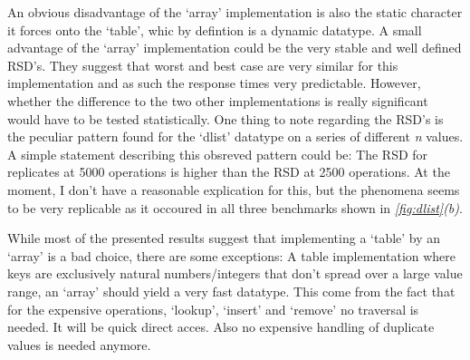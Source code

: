 \documentclass[a4paper,11pt,twoside]{article}
\begin{document}
An obvious disadvantage of the `array' implementation is also the
static character it forces onto the `table', whic by defintion is a 
dynamic datatype. A small advantage of the `array' implementation could be the
very stable and well defined RSD's. They suggest that worst and best
case are very similar for this implementation and as such the response
times very predictable. However, whether the difference to the two
other implementations is really significant would have to be tested
statistically. One thing to note regarding the RSD's is the peculiar
pattern found for the `dlist' datatype on a series of different
\textit{n} values. A simple statement describing this obsreved pattern
could be: The RSD for replicates at 5000 operations is higher than the
RSD at 2500 operations. At the moment, I don't have a reasonable
explication for this, but the phenomena seems to be very replicable as
it occoured in all three benchmarks shown in
\textit{\ref{fig:dlist}(b)}.

While most of the presented results suggest that implementing a
`table' by an `array' is a bad choice, there are some
exceptions: A table implementation where keys are exclusively 
natural numbers/integers that don't spread over a large value range, 
an `array' should yield a very fast datatype. This come from the fact
that for the expensive operations, `lookup', `insert' and `remove' no
traversal is needed. It will be quick direct acces. Also no expensive
handling of duplicate values is needed anymore.  


\end{document}
